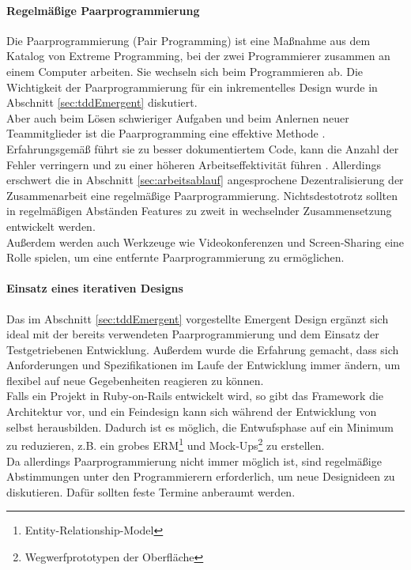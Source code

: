 \paragraph{Regelmäßige Paarprogrammierung} Die Paarprogrammierung (Pair Programming) ist eine Maßnahme aus dem Katalog von Extreme Programming, bei der zwei Programmierer zusammen an einem Computer arbeiten. Sie wechseln sich beim Programmieren ab. Die Wichtigkeit der Paarprogrammierung für ein inkrementelles Design wurde in Abschnitt \ref{sec:tddEmergent} diskutiert.\\ Aber auch beim Lösen schwieriger Aufgaben und beim Anlernen neuer Teammitglieder ist die Paarprogramming eine effektive Methode \citep[S. 9]{hulkko_multiple_2005}. Erfahrungsgemäß führt sie zu besser dokumentiertem Code, kann die Anzahl der Fehler verringern und zu einer höheren Arbeitseffektivität führen \citep{hulkko_multiple_2005}.
Allerdings erschwert die in Abschnitt \ref{sec:arbeitsablauf} angesprochene Dezentralisierung der Zusammenarbeit eine regelmäßige Paarprogrammierung. Nichtsdestotrotz sollten in regelmäßigen Abständen Features zu zweit in wechselnder Zusammensetzung entwickelt werden.\\
Außerdem werden auch Werkzeuge wie Videokonferenzen und Screen-Sharing eine Rolle spielen, um eine entfernte Paarprogrammierung zu ermöglichen.

\paragraph{Einsatz eines iterativen Designs} Das im Abschnitt \ref{sec:tddEmergent} vorgestellte Emergent Design ergänzt sich ideal mit der bereits verwendeten Paarprogrammierung und dem Einsatz der Testgetriebenen Entwicklung. Außerdem wurde die Erfahrung gemacht, dass sich Anforderungen und Spezifikationen im Laufe der Entwicklung immer ändern, um flexibel auf neue Gegebenheiten reagieren zu können.\\
Falls ein Projekt in Ruby-on-Rails entwickelt wird, so gibt das Framework die Architektur vor, und ein Feindesign kann sich während der Entwicklung von selbst herausbilden. Dadurch ist es möglich, die Entwufsphase auf ein Minimum zu reduzieren, z.B. ein grobes ERM\footnote{Entity-Relationship-Model} und Mock-Ups\footnote{Wegwerfprototypen der Oberfläche} zu erstellen.\\
Da allerdings Paarprogrammierung nicht immer möglich ist, sind regelmäßige Abstimmungen unter den Programmierern erforderlich, um neue Designideen zu diskutieren. Dafür sollten feste Termine anberaumt werden.


